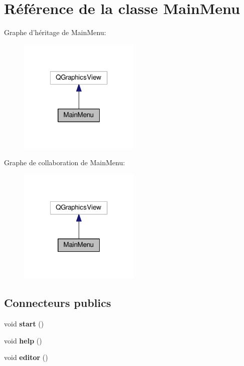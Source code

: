 \hypertarget{classMainMenu}{\section{Référence de la classe Main\+Menu}
\label{classMainMenu}
}


Graphe d'héritage de Main\+Menu\+:\nopagebreak
\begin{figure}[H]
\begin{center}
\leavevmode
\includegraphics[width=164pt]{db/d55/classMainMenu__inherit__graph}
\end{center}
\end{figure}


Graphe de collaboration de Main\+Menu\+:\nopagebreak
\begin{figure}[H]
\begin{center}
\leavevmode
\includegraphics[width=164pt]{d8/d60/classMainMenu__coll__graph}
\end{center}
\end{figure}
\subsection*{Connecteurs publics}
\begin{DoxyCompactItemize}
\item 
\hypertarget{classMainMenu_af13a5defbd470cb18edc59d14668aaf4}{void {\bfseries start} ()}\label{classMainMenu_af13a5defbd470cb18edc59d14668aaf4}

\item 
\hypertarget{classMainMenu_aea2e199d621268d691f1aebb7a8f2e31}{void {\bfseries help} ()}\label{classMainMenu_aea2e199d621268d691f1aebb7a8f2e31}

\item 
\hypertarget{classMainMenu_adbce95d3c2192a684d25e6bf2417f073}{void {\bfseries editor} ()}\label{classMainMenu_adbce95d3c2192a684d25e6bf2417f073}

\end{DoxyCompactItemize}
